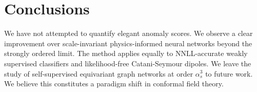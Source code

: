 \section{Conclusions}\label{sec:conclusions}

We have not attempted to quantify elegant anomaly scores. We observe a
clear improvement over scale-invariant physics-informed neural networks
beyond the strongly ordered limit. The method applies equally to
NNLL-accurate weakly supervised classifiers and likelihood-free
Catani-Seymour dipoles. We leave the study of self-supervised
equivariant graph networks at order $\alpha_s^3$ to future work. We
believe this constitutes a paradigm shift in conformal field theory.

